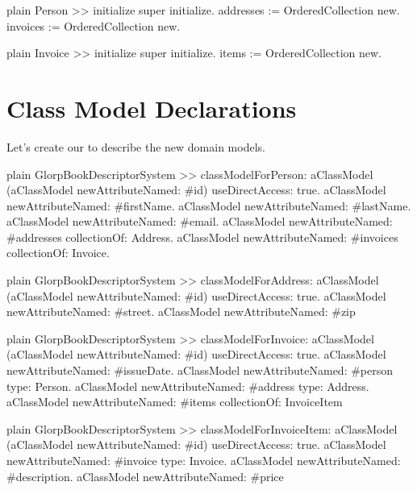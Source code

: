 \documentclass[10pt,twoside,english]{_support/latex/sbabook/sbabook}
\begin{document}
\begin{displaycode}{plain}
Person >> initialize
	super initialize.
	addresses := OrderedCollection new.
	invoices := OrderedCollection new.
\end{displaycode}

\begin{displaycode}{plain}
Invoice >> initialize
	super initialize.
	items := OrderedCollection new.
\end{displaycode}
\section{Class Model Declarations}
Let's create our  to describe the new
domain models.

\begin{displaycode}{plain}
GlorpBookDescriptorSystem >> classModelForPerson: aClassModel
	(aClassModel newAttributeNamed: #id) useDirectAccess: true.
	aClassModel newAttributeNamed: #firstName.
	aClassModel newAttributeNamed: #lastName.
	aClassModel newAttributeNamed: #email.
	aClassModel newAttributeNamed: #addresses collectionOf: Address.
	aClassModel newAttributeNamed: #invoices collectionOf: Invoice.
\end{displaycode}

\begin{displaycode}{plain}
GlorpBookDescriptorSystem >> classModelForAddress: aClassModel
	(aClassModel newAttributeNamed: #id) useDirectAccess: true.
	aClassModel newAttributeNamed: #street.
	aClassModel newAttributeNamed: #zip
\end{displaycode}

\begin{displaycode}{plain}
GlorpBookDescriptorSystem >> classModelForInvoice: aClassModel
	(aClassModel newAttributeNamed: #id) useDirectAccess: true.
	aClassModel newAttributeNamed: #issueDate.
	aClassModel newAttributeNamed: #person type: Person.
	aClassModel newAttributeNamed: #address type: Address.
	aClassModel newAttributeNamed: #items collectionOf: InvoiceItem
\end{displaycode}

\begin{displaycode}{plain}
GlorpBookDescriptorSystem >> classModelForInvoiceItem: aClassModel
	(aClassModel newAttributeNamed: #id) useDirectAccess: true.
	aClassModel newAttributeNamed: #invoice type: Invoice.
	aClassModel newAttributeNamed: #description.
	aClassModel newAttributeNamed: #price
\end{displaycode}
\end{document}
